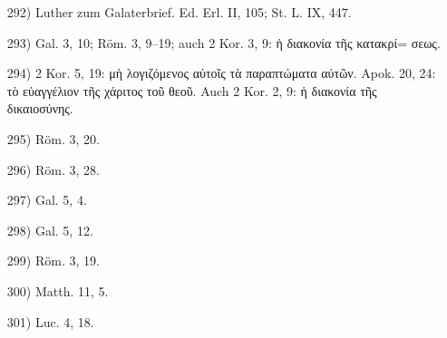 \footnotesize
\begin{enumerate}
\item[292)] Luther zum Galaterbrief. Ed. Erl. II, 105; St. L. IX, 447.
\item[293)] Gal. 3, 10; Röm. 3, 9–19; auch 2 Kor. 3, 9: \foreignlanguage{greek}{ἡ διακονία τῆς κατακρί=
σεως.}
\item[294)] 2 Kor. 5, 19: \foreignlanguage{greek}{μὴ λογιζόμενος αὐτοῖς τὰ παραπτώματα αὐτῶν.} Apok. 20, 24: \foreignlanguage{greek}{τὸ εὐαγγέλιον τῆς χάριτος τοῦ θεοῦ.} Auch 2 Kor. 2, 9: \foreignlanguage{greek}{ἡ διακονία τῆς δικαιοσύνης.}
\item[295)] Röm. 3, 20.
\item[296)] Röm. 3, 28.
\item[297)] Gal. 5, 4.
\item[298)] Gal. 5, 12.
\item[299)] Röm. 3, 19.
\item[300)] Matth. 11, 5.
\item[301)] Luc. 4, 18.
\end{enumerate}
